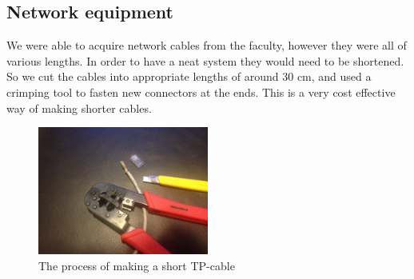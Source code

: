 \subsection{Network equipment}
We were able to acquire network cables from the faculty, however they were all of various lengths. In order to have a neat system they would need to be shortened. So we cut the cables into appropriate lengths of around 30 cm, and used a crimping tool to fasten new connectors at the ends. This is a very cost effective way of making shorter cables. 

\begin{figure}[h]
    \centering
    \includegraphics[width=0.5\textwidth]{thebuild/tp_cable.jpg}
    \caption{The process of making a short TP-cable}
    \label{fig:build_tp_cable}
\end{figure}


